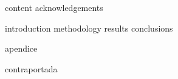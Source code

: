 % 
% 





{content}
{acknowledgements}

\hypersetup{linkcolor=azul!60}
{\pagestyle{toc}{
  \tableofcontents
  \newpage}}

\resetfancystyle
\hypersetup{linkcolor=smalt(darkpowderblue)}

\printglossary[type=acronyms,style=acronym]

{introduction}
{methodology}
{results}
{conclusions}

{apendice}



{contraportada}




